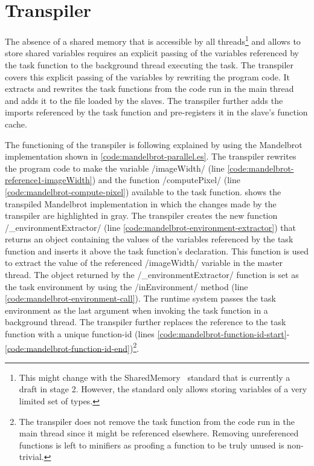 \section{Transpiler}\label{sec:transpiler}
The absence of a shared memory that is accessible by all threads\footnote{This might change with the SharedMemory~\cite{Ecma2016} standard that is currently a draft in stage 2. However, the standard only allows storing variables of a very limited set of types.} and allows to store shared variables requires an explicit passing of the variables referenced by the task function to the background thread executing the task. The transpiler covers this explicit passing of the variables by rewriting the program code. It extracts and rewrites the task functions from the code run in the main thread and adds it to the file loaded by the slaves. The transpiler further adds the imports referenced by the task function and pre-registers it in the slave's function cache. 

The functioning of the transpiler is following explained by using the Mandelbrot implementation shown in \cref{code:mandelbrot-parallel.es}. The transpiler rewrites the program code to make the variable \javascriptinline/imageWidth/ (line \ref{code:mandelbrot-reference1-imageWidth}) and the function \javascriptinline/computePixel/ (line \ref{code:mandelbrot-compute-pixel}) available to the task function.  shows the transpiled Mandelbrot implementation in which the changes made by the transpiler are highlighted in gray. The transpiler creates the new function \javascriptinline/_environmentExtractor/ (line \ref{code:mandelbrot-environment-extractor}) that returns an object containing the values of the variables referenced by the task function and inserts it above the task function's declaration. This function is used to extract the value of the referenced \javascriptinline/imageWidth/ variable in the master thread. The object returned by the \javascriptinline/_environmentExtractor/ function is set as the task environment by using the \javascriptinline/inEnvironment/ method (line \ref{code:mandelbrot-environment-call}). The runtime system passes the task environment as the last argument when invoking the task function in a background thread. The transpiler further replaces the reference to the task function with a unique function-id (lines \ref{code:mandelbrot-function-id-start}-\ref{code:mandelbrot-function-id-end})\footnote{The transpiler does not remove the task function from the code run in the main thread since it might be referenced elsewhere. Removing unreferenced functions is left to minifiers as proofing a function to be truly unused is non-trivial.}. 

